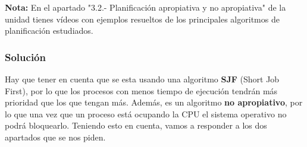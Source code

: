 \textbf{Nota:} En el apartado "3.2.- Planificación apropiativa y no apropiativa" de la unidad tienes vídeos con ejemplos resueltos de los principales algoritmos de planificación estudiados.

\subsubsection{Solución}

Hay que tener en cuenta que se esta usando una algoritmo \textbf{SJF} (Short Job First), por lo que los procesos con menos tiempo de ejecución tendrán más prioridad que los que tengan más. Además, es un algoritmo \textbf{no apropiativo}, por lo que una vez que un proceso está ocupando la CPU el sistema operativo no podrá bloquearlo. Teniendo esto en cuenta, vamos a responder a los dos apartados que se nos piden.

